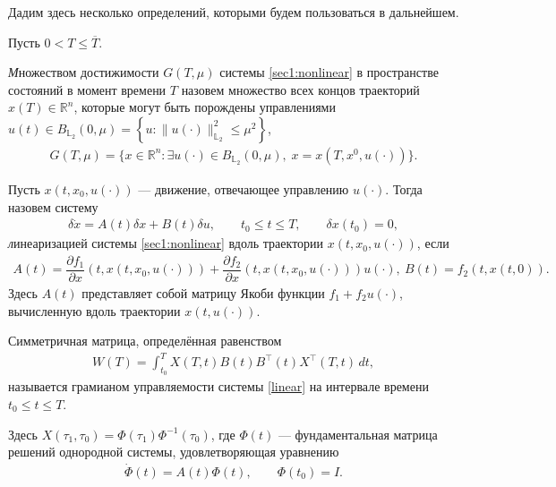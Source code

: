 \documentclass[../main.tex]{subfiles}
\begin{document}
	Дадим здесь несколько определений, которыми будем пользоваться в дальнейшем.
	
	Пусть $ 0 <  T \leqslant \overline{T} $.
	\begin{definition}
		{\textit  Множеством достижимости} $ G(T,\mu) $ системы \eqref{sec1:nonlinear} в пространстве состояний в момент времени $ T $ назовем множество всех концов траекторий $ x(T) \in \mathbb{R}^n $,  которые могут быть порождены управлениями	$ u(t) \in B_{\mathbb{L}_2}(0,\mu) =\left\lbrace u:\lVert u(\cdot)\rVert^2_{\mathbb{L}_2} \leqslant \mu^2\right\rbrace  $,
		\begin{gather*}
			G(T,\mu)=\{x\in \mathbb{R}^n:\exists u(\cdot)\in B_{\mathbb{L}_2}(0,\mu),\; x=x(T,x^0,u(\cdot))\}.
		\end{gather*}
	\end{definition}
	\begin{definition}
		Пусть $ x(t,x_0,u(\cdot)) $ --- движение, отвечающее управлению $ u(\cdot)$. Тогда назовем систему
		\begin{gather}\label{linear}
			\delta \dot{x} =  A(t) \delta x + B(t) \delta u, \qquad t_0 \leqslant t \leqslant T, \qquad \delta x(t_0) = 0,
		\end{gather}
		{\textit линеаризацией} системы \eqref{sec1:nonlinear} вдоль траектории $ x(t,x_0,u(\cdot)) $, если 
		\begin{gather*}
		    A(t) = \dfrac{\partial f_1}{\partial x} (t,x(t,x_0,u(\cdot))) + \dfrac{\partial f_2}{\partial x}(t,x(t,x_0,u(\cdot))) u(\cdot), \  B(t) = f_2 (t,x(t,0)).
		\end{gather*} Здесь $ A(t) $ представляет собой матрицу Якоби функции $ f_1 + f_2 u(\cdot) $, вычисленную вдоль траектории $ x(t,u(\cdot)) $.
	\end{definition}
	\begin{definition}
	Симметричная матрица, определённая равенством
		\begin{gather*}
			W(T) = \int_{t_0}^{T}X(T,t)B(t)B^{\top}(t)X^{\top}(T,t) \, dt,
		\end{gather*}
	называется грамианом управляемости системы \eqref{linear} на интервале времени $  t_0 \leqslant t \leqslant T $.
	\end{definition}
	Здесь $ X(\tau_1,\tau_0)= \Phi(\tau_1) \Phi^{-1}(\tau_0) $, где $\Phi(t) $ --- фундаментальная матрица решений однородной системы, удовлетворяющая уравнению 
	\begin{gather*}
		\dot{\Phi}(t) = A(t) \Phi(t), \qquad \Phi(t_0) = I.
	\end{gather*}
\end{document}
